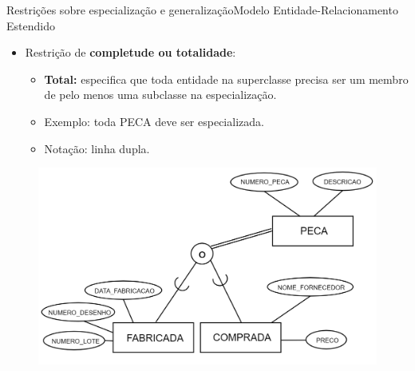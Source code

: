 \documentclass[t]{beamer}
\begin{document}
\begin{ftst}{Restrições sobre especialização e generalização}{Modelo Entidade-Relacionamento Estendido}
\small
\begin{itemize}
    \item Restrição de \textbf{completude ou totalidade}:
    \begin{itemize}
        \item \textbf{Total: }especifica que toda entidade na superclasse precisa ser um membro de pelo menos uma subclasse na especialização.
        \item Exemplo: toda PECA deve ser especializada.
        \item Notação: linha dupla.
    \end{itemize}
\end{itemize}
\begin{figure}
    \centering
    \includegraphics[scale=0.13]{Figuras/02_2.png}
\end{figure}

\end{ftst}

\end{document}
